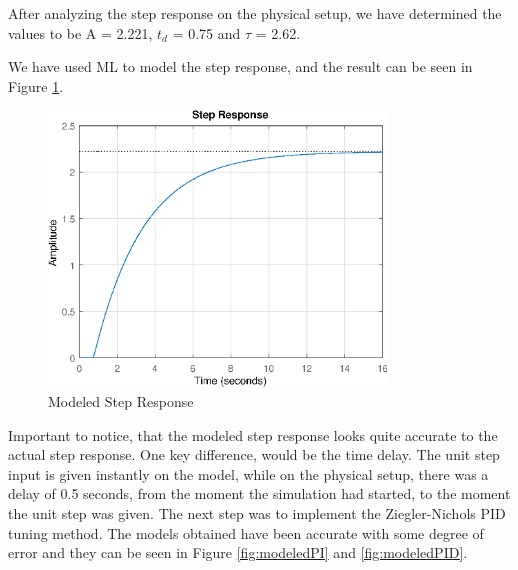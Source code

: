 After analyzing the step response on the physical setup, we have determined the values to be A = 2.221, 
$t_d$ = 0.75 and $\tau$ = 2.62.

We have used ML to model the step response, and the result can be seen in Figure \ref{fig:modeledStepResponse}.

\begin{figure}[ht]
	\centering
	\includegraphics[width=0.8\textwidth]{figures/06ModelValidation/modeledStepResponse.eps}
	\caption{Modeled Step Response}
	\label{fig:modeledStepResponse}
\end{figure}

Important to notice, that the modeled step response looks quite accurate to the actual step response.
One key difference, would be the time delay. The unit step input is given instantly on the model,
while on the physical setup, there was a delay of 0.5 seconds, from the moment the simulation had started,
to the moment the unit step was given.
The next step was to implement the Ziegler-Nichols PID tuning method. The models obtained have been accurate
with some degree of error and they can be seen in Figure \ref{fig:modeledPI} and \ref{fig:modeledPID}.

